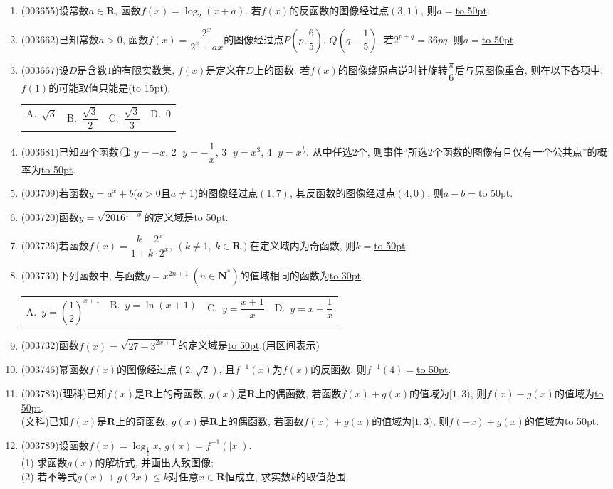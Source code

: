 \documentclass[10pt,a4paper]{article}
\newcommand{\blank}[1]{\underline{\hbox to #1pt{}}}
\newcommand{\bracket}[1]{(\hbox to #1pt{})}
\newcommand{\fourch}[4]{\par\begin{tabular}{p{.23\textwidth}p{.23\textwidth}p{.23\textwidth}p{.23\textwidth}}
A.~#1 &B.~#2& C.~#3& D.~#4
\end{tabular}}
\begin{document}
\begin{enumerate}[1.]
\item {\tiny (003655)}设常数$a\in \mathbf{R}$, 函数$f(x)=\log_2(x+a)$. 若$f(x)$的反函数的图像经过点$(3,1)$, 则$a=$\blank{50}.
\item {\tiny (003662)}已知常数$a>0$, 函数$f(x)=\dfrac{2^x}{2^x+ax}$的图像经过点$P\left(p,\dfrac{6}{5}\right)$, $Q\left(q,-\dfrac{1}{5}\right)$. 若$2^{p+q}=36pq$, 则$a=$\blank{50}.
\item {\tiny (003667)}设$D$是含数$1$的有限实数集, $f(x)$是定义在$D$上的函数. 若$f(x)$的图像绕原点逆时针旋转$\dfrac{\pi}{6}$后与原图像重合, 则在以下各项中, $f(1)$的可能取值只能是\bracket{15}.
\fourch{$\sqrt{3}$}{$\dfrac{\sqrt{3}}{2}$}{$\dfrac{\sqrt{3}}{3}$}{$0$}
\item {\tiny (003681)}已知四个函数: \textcircled{1} $y=-x$, \textcircled{2} $y=-\dfrac{1}{x}$, \textcircled{3} $y=x^3$, \textcircled{4} $y=x^{\frac{1}{2}}$. 从中任选$2$个, 则事件``所选$2$个函数的图像有且仅有一个公共点''的概率为\blank{50}.
\item {\tiny (003709)}若函数$y=a^x+b$($a>0$且$a\ne 1$)的图像经过点$(1,7)$, 其反函数的图像经过点$(4,0)$, 则$a-b=$\blank{50}.
\item {\tiny (003720)}函数$y=\sqrt{2016^{1-x}}$的定义域是\blank{50}.
\item {\tiny (003726)}若函数$f(x)=\dfrac{k-2^x}{1+k\cdot 2^x}, \ (k\ne 1, \ k\in \mathbf{R})$在定义域内为奇函数, 则$k=$\blank{50}.
\item {\tiny (003730)}下列函数中, 与函数$y=x^{2n+1} \ (n\in \mathbf{N}^*)$的值域相同的函数为\blank{30}.
\fourch{$y=\left(\dfrac 12\right)^{x+1}$}{$y=\ln(x+1)$}{$y=\dfrac{x+1}{x}$}{$y=x+\dfrac 1x$}
\item {\tiny (003732)}函数$f(x)=\sqrt{27-3^{2x+1}}$的定义域是\blank{50}.(用区间表示)
\item {\tiny (003746)}幂函数$f(x)$的图像经过点$(2,\sqrt{2})$, 且$f^{-1}(x)$为$f(x)$的反函数, 则$f^{-1}(4)=$\blank{50}.
\item {\tiny (003783)}(理科)已知$f(x)$是$\mathbf{R}$上的奇函数, $g(x)$是$\mathbf{R}$上的偶函数, 若函数$f(x)+g(x)$的值域为$[1,3)$, 则$f(x)-g(x)$的值域为\blank{50}.\\
(文科)已知$f(x)$是$\mathbf{R}$上的奇函数, $g(x)$是$\mathbf{R}$上的偶函数, 若函数$f(x)+g(x)$的值域为$[1,3)$, 则$f(-x)+g(x)$的值域为\blank{50}.
\item {\tiny (003789)}设函数$f(x)=\log_\frac 12 x$, $g(x)=f^{-1}(|x|)$.\\
(1) 求函数$g(x)$的解析式, 并画出大致图像;\\
(2) 若不等式$g(x)+g(2x)\le k$对任意$x\in \mathbf{R}$恒成立, 求实数$k$的取值范围.

\end{enumerate}
\end{document}

